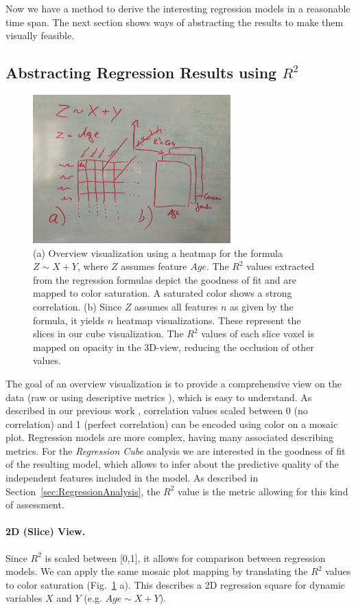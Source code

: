 \documentclass[journal]{style/vgtc} 			          %
\begin{document}
Now we have a method to derive the interesting regression models in a reasonable time span.
The next section shows ways of abstracting the results to make them visually feasible.

\subsection{Abstracting Regression Results using $R^2$}
\begin{figure}[htb]
 \centering
 \includegraphics[width=3.0in]{figures/cube_sketch}
 \caption{
 (a) Overview visualization using a heatmap for the formula $Z \sim X + Y$, where $Z$ assumes feature $Age$.
 The $R^2$ values extracted from the regression formulas depict the goodness of fit and are mapped to color saturation.
 A saturated color shows a strong correlation.
 (b) Since $Z$ assumes all features $n$ as given by the formula, it yields $n$ heatmap visualizations.
 These represent the slices in our cube visualization.
 The $R^2$ values of each slice voxel is mapped on opacity in the 3D-view, reducing the occlusion of other values.
 }
  \label{fig:Cube}
\end{figure}
The goal of an overview visualization is to provide a comprehensive view on the data (raw or using descriptive metrics \cite{Bertini}), which is easy to understand.
As described in our previous work \cite{Klemm2014VIS}, correlation values scaled between 0 (no correlation) and 1 (perfect correlation) can be encoded using color on a mosaic plot.
Regression models are more complex, having many associated describing metrics.
For the \emph{Regression Cube} analysis we are interested in the goodness of fit of the resulting model, which allows to infer about the predictive quality of the independent features included in the model.
As described in Section~\ref{sec:RegressionAnalysis}, the $R^2$ value is the metric allowing for this kind of assessment.
\paragraph{2D (Slice) View.}
Since $R^2$ is scaled between [0,1], it allows for comparison between regression models.
We can apply the same mosaic plot mapping by translating the $R^2$ values to color saturation (Fig.~\ref{fig:Cube} a).
This describes a 2D regression square for dynamic variables $X$ and $Y$ (e.g. $Age \sim X + Y$).
\end{document}
